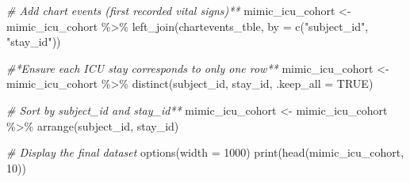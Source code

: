 \documentclass[
]{article}
\newenvironment{Shaded}{\begin{snugshade}}{\end{snugshade}}
\newcommand{\AttributeTok}[1]{\textcolor[rgb]{0.77,0.63,0.00}{#1}}
\newcommand{\CommentTok}[1]{\textcolor[rgb]{0.56,0.35,0.01}{\textit{#1}}}
\newcommand{\ConstantTok}[1]{\textcolor[rgb]{0.00,0.00,0.00}{#1}}
\newcommand{\DecValTok}[1]{\textcolor[rgb]{0.00,0.00,0.81}{#1}}
\newcommand{\FunctionTok}[1]{\textcolor[rgb]{0.00,0.00,0.00}{#1}}
\newcommand{\NormalTok}[1]{\textcolor[rgb]{0.00,0.00,0.00}{#1}}
\newcommand{\OtherTok}[1]{\textcolor[rgb]{0.56,0.35,0.01}{#1}}
\newcommand{\SpecialCharTok}[1]{\textcolor[rgb]{0.00,0.00,0.00}{#1}}
\newcommand{\StringTok}[1]{\textcolor[rgb]{0.31,0.60,0.02}{#1}}
\begin{document}
\begin{Shaded}
\begin{Highlighting}[]
\CommentTok{\# Add chart events (first recorded vital signs)**}
\NormalTok{mimic\_icu\_cohort }\OtherTok{\textless{}{-}}\NormalTok{ mimic\_icu\_cohort }\SpecialCharTok{\%\textgreater{}\%}
  \FunctionTok{left\_join}\NormalTok{(chartevents\_tble, }\AttributeTok{by =} \FunctionTok{c}\NormalTok{(}\StringTok{"subject\_id"}\NormalTok{, }\StringTok{"stay\_id"}\NormalTok{))}

\CommentTok{\#*Ensure each ICU stay corresponds to only one row**}
\NormalTok{mimic\_icu\_cohort }\OtherTok{\textless{}{-}}\NormalTok{ mimic\_icu\_cohort }\SpecialCharTok{\%\textgreater{}\%}
  \FunctionTok{distinct}\NormalTok{(subject\_id, stay\_id, }\AttributeTok{.keep\_all =} \ConstantTok{TRUE}\NormalTok{)}

\CommentTok{\# Sort by subject\_id and stay\_id**}
\NormalTok{mimic\_icu\_cohort }\OtherTok{\textless{}{-}}\NormalTok{ mimic\_icu\_cohort }\SpecialCharTok{\%\textgreater{}\%}
  \FunctionTok{arrange}\NormalTok{(subject\_id, stay\_id)}

\CommentTok{\# Display the final dataset}
\FunctionTok{options}\NormalTok{(}\AttributeTok{width =} \DecValTok{1000}\NormalTok{)}
\FunctionTok{print}\NormalTok{(}\FunctionTok{head}\NormalTok{(mimic\_icu\_cohort, }\DecValTok{10}\NormalTok{))}
\end{Highlighting}
\end{Shaded}
\end{document}
